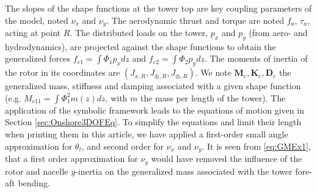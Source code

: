 \documentclass[wes, manuscript]{copernicus}
\renewcommand{\v}[1]{\boldsymbol{#1}}
\newcommand{\m}[1]{\boldsymbol{#1}}
\begin{document}
The slopes of the shape functions at the tower top are key coupling parameters of the model, noted $\nu_x$ and $\nu_y$. 
The aerodynamic thrust and torque are noted $f_a$, $\tau_a$, acting at point $R$.
The distributed loads on the tower, $p_x$ and $p_y$ (from aero- and hydrodynamics), are projected against the shape functions to obtain the generalized forces $f_{e1}=\int \Phi_1 p_x dz$ and  $f_{e2}=\int \Phi_2 p_y dz$. 
The moments of inertia of the rotor in its coordinates are $(J_{x,R}, J_{\oplus,R}, J_{\oplus,R})$.
We note $\m{M}_e, \m{K}_e, \m{D}_e$  the generalized mass, stiffness and damping associated with a given shape function (e.g. $M_{e11}=\int \Phi_1^2 m(z) dz$, with $m$ the mass per length of the tower). 
The application of the symbolic framework leads to the equations of motion given in Section \ref{sec:Onshore3DOFEq}.
To simplify the equations and limit their length when printing them in this article, we have applied a first-order small angle approximation for $\theta_t$, and second order for $\nu_x$ and $\nu_y$.
It is seen from \autoref{eq:GMEx1}, that a first order approximation for $\nu_y$ would have removed the influence of the rotor and nacelle $y$-inertia on the generalized mass associated with the tower fore-aft bending. 
\end{document}
